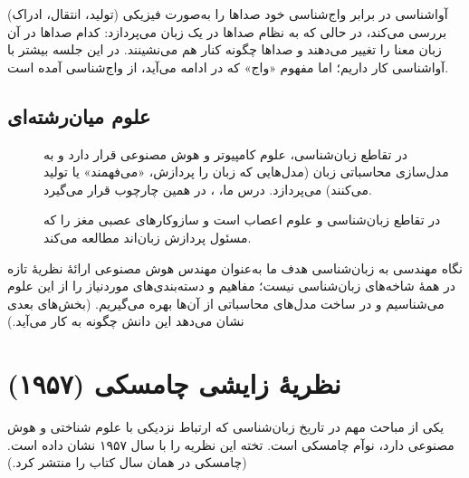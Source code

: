 \begin{addedbox}{آواشناسی در برابر واج‌شناسی}
 خود صداها را به‌صورت فیزیکی (تولید، انتقال، ادراک) بررسی می‌کند، در حالی که  به نظام صداها در یک زبان می‌پردازد: کدام صداها در آن زبان معنا را تغییر می‌دهند و صداها چگونه کنار هم می‌نشینند. در این جلسه بیشتر با آواشناسی کار داریم؛ اما مفهوم «واج» که در ادامه می‌آید، از واج‌شناسی آمده است.
\end{addedbox}

\subsection{علوم میان‌رشته‌ای}
\begin{description}
  \item[] در تقاطع زبان‌شناسی، علوم کامپیوتر و هوش مصنوعی قرار دارد و به مدل‌سازی محاسباتی زبان (مدل‌هایی که زبان را پردازش، «می‌فهمند» یا تولید می‌کنند) می‌پردازد. درس ما، ، در همین چارچوب قرار می‌گیرد.
  \item[] در تقاطع زبان‌شناسی و علوم اعصاب است و سازوکارهای عصبی مغز را که مسئول پردازش زبان‌اند مطالعه می‌کند.
\end{description}

\begin{exambox}{نگاه مهندسی به زبان‌شناسی}
هدف ما به‌عنوان مهندس هوش مصنوعی ارائهٔ نظریهٔ تازه در همهٔ شاخه‌های زبان‌شناسی نیست؛ مفاهیم و دسته‌بندی‌های موردنیاز را از این علوم می‌شناسیم و در ساخت مدل‌های محاسباتی از آن‌ها بهره می‌گیریم. (بخش‌های بعدی نشان می‌دهد این دانش چگونه به کار می‌آید.)
\end{exambox}

\section{نظریهٔ زایشی چامسکی (۱۹۵۷)}

یکی از مباحث مهم در تاریخ زبان‌شناسی که ارتباط نزدیکی با علوم شناختی و هوش مصنوعی دارد،  نوآم چامسکی است. تخته این نظریه را با سال ۱۹۵۷ نشان داده است. (چامسکی در همان سال کتاب  را منتشر کرد.)

